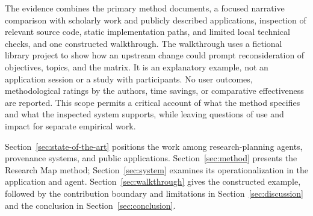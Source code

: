 The evidence combines the primary method documents, a focused narrative comparison with scholarly work and publicly described applications, inspection of relevant source code, static implementation paths, and limited local technical checks, and one constructed walkthrough. The walkthrough uses a fictional library project to show how an upstream change could prompt reconsideration of objectives, topics, and the matrix. It is an explanatory example, not an application session or a study with participants. No user outcomes, methodological ratings by the authors, time savings, or comparative effectiveness are reported. This scope permits a critical account of what the method specifies and what the inspected system supports, while leaving questions of use and impact for separate empirical work.

Section~\ref{sec:state-of-the-art} positions the work among research-planning agents, provenance systems, and public applications. Section~\ref{sec:method} presents the Research Map method; Section~\ref{sec:system} examines its operationalization in the application and agent. Section~\ref{sec:walkthrough} gives the constructed example, followed by the contribution boundary and limitations in Section~\ref{sec:discussion} and the conclusion in Section~\ref{sec:conclusion}.

